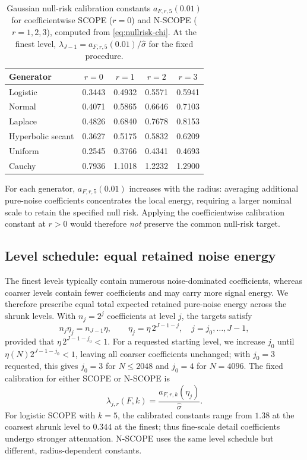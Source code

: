 \documentclass[12pt]{article}
\theoremstyle{definition}
\theoremstyle{definition}
\begin{document}
\begin{table}[t]
\centering\small
\caption{Gaussian null-risk calibration constants $a_{F,r,5}(0.01)$ for
coefficientwise SCOPE ($r=0$) and N-SCOPE ($r=1,2,3$), computed from
\eqref{eq:nullrisk-chi}. At the finest level,
$\lambda_{J-1}=a_{F,r,5}(0.01)/\widehat\sigma$ for the fixed procedure.}
\label{tab:aF}
\begin{tabular}{lcccc}
\toprule
Generator & $r=0$ & $r=1$ & $r=2$ & $r=3$ \\
\midrule
Logistic          & 0.3443 & 0.4932 & 0.5571 & 0.5941 \\
Normal            & 0.4071 & 0.5865 & 0.6646 & 0.7103 \\
Laplace           & 0.4826 & 0.6840 & 0.7678 & 0.8153 \\
Hyperbolic secant & 0.3627 & 0.5175 & 0.5832 & 0.6209 \\
Uniform           & 0.2545 & 0.3766 & 0.4341 & 0.4693 \\
Cauchy            & 0.7936 & 1.1018 & 1.2232 & 1.2900 \\
\bottomrule
\end{tabular}
\end{table}

For each generator, $a_{F,r,5}(0.01)$ increases with the radius:
averaging additional pure-noise coefficients concentrates the local
energy, requiring a larger nominal scale to retain the specified
null risk. Applying the coefficientwise calibration constant at
$r>0$ would therefore \emph{not} preserve the common null-risk target.

\subsection{Level schedule: equal retained noise energy}
\label{sec:enb}

The finest levels typically contain numerous noise-dominated
coefficients, whereas coarser levels contain fewer coefficients and
may carry more signal energy. We therefore prescribe equal total
expected retained pure-noise energy across the shrunk levels.
With $n_j=2^j$ coefficients at level $j$, the targets satisfy
\begin{equation}
n_j\eta_j=n_{J-1}\eta,
\qquad
\eta_j=\eta\,2^{J-1-j},\quad j=j_0,\ldots,J-1,
\label{eq:enb}
\end{equation}
provided that $\eta\,2^{J-1-j_0}<1$. For a requested starting level,
we increase $j_0$ until $\eta(N)2^{J-1-j_0}<1$, leaving all coarser
coefficients unchanged; with $j_0=3$ requested, this gives $j_0=3$ for
$N\le2048$ and $j_0=4$ for $N=4096$. The fixed calibration for either
SCOPE or N-SCOPE is
\begin{equation}
\lambda_{j,r}(F,k)=\frac{a_{F,r,k}(\eta_j)}{\widehat\sigma}.
\label{eq:cal-fixed-scale}
\end{equation}
For logistic SCOPE with $k=5$, the calibrated constants range
from $1.38$ at the coarsest shrunk level to $0.344$ at the
finest; thus fine-scale detail coefficients undergo stronger
attenuation. N-SCOPE uses the same level schedule but different,
radius-dependent constants.
\end{document}
